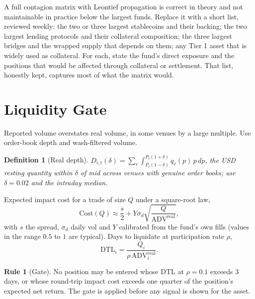 \documentclass[11pt,a4paper]{article}
\newtheorem{definition}{Definition}[section]
\theoremstyle{definition}
\newtheorem{rule_}{Rule}[section]
\begin{document}
A full contagion matrix with Leontief propagation is correct in theory and not maintainable in practice below the largest funds. Replace it with a short list, reviewed weekly: the two or three largest stablecoins and their backing; the two largest lending protocols and their collateral composition; the three largest bridges and the wrapped supply that depends on them; any Tier 1 asset that is widely used as collateral. For each, state the fund's direct exposure and the positions that would be affected through collateral or settlement. That list, honestly kept, captures most of what the matrix would.

\section{Liquidity Gate}\label{sec:liquidity}

Reported volume overstates real volume, in some venues by a large multiple. Use order-book depth and wash-filtered volume.

\begin{definition}[Real depth]
$D_{i,t}(\delta) = \sum_v \int_{P_t(1-\delta)}^{P_t(1+\delta)} q_v(p)\,p\,dp$, the USD resting quantity within $\delta$ of mid across venues with genuine order books; use $\delta = 0.02$ and the intraday median.
\end{definition}

Expected impact cost for a trade of size $Q$ under a square-root law,
\begin{equation}
\mathrm{Cost}(Q) \approx \frac{s}{2} + Y\sigma_d\sqrt{\frac{Q}{\mathrm{ADV}^{\mathrm{real}}}},
\end{equation}
with $s$ the spread, $\sigma_d$ daily vol and $Y$ calibrated from the fund's own fills (values in the range $0.5$ to $1$ are typical). Days to liquidate at participation rate $\rho$,
\begin{equation}
\mathrm{DTL}_i = \frac{Q_i}{\rho\,\mathrm{ADV}^{\mathrm{real}}_i}.
\end{equation}

\begin{rule_}[Gate]
No position may be entered whose $\mathrm{DTL}$ at $\rho = 0.1$ exceeds 3 days, or whose round-trip impact cost exceeds one quarter of the position's expected net return. The gate is applied before any signal is shown for the asset.
\end{rule_}
\end{document}
